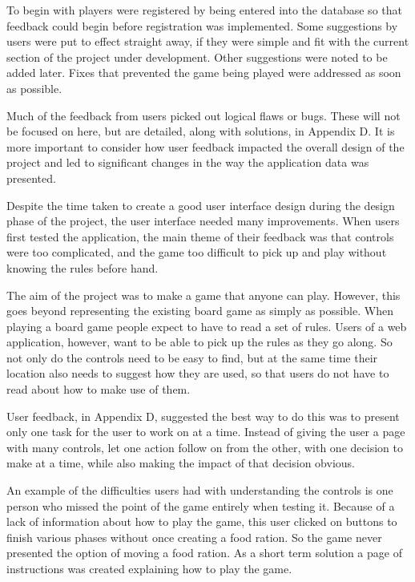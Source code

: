 To begin with players were registered by being entered into the database so that feedback could begin before registration was implemented. Some suggestions by users were put to effect straight away, if they were simple and fit with the current section of the project under development. Other suggestions were noted to be added later. Fixes that prevented the game being played were addressed as soon as possible.

Much of the feedback from users picked out logical flaws or bugs. These will not be focused on here, but are detailed, along with solutions, in Appendix D. It is more important to consider how user feedback impacted the overall design of the project and led to significant changes in the way the application data was presented.

Despite the time taken to create a good user interface design during the design phase of the project, the user interface needed many improvements. When users first tested the application, the main theme of their feedback was that controls were too complicated, and the game too difficult to pick up and play without knowing the rules before hand.

The aim of the project was to make a game that anyone can play. However, this goes beyond representing the existing board game as simply as possible. When playing a board game people expect to have to read a set of rules. Users of a web application, however, want to be able to pick up the rules as they go along. So not only do the controls need to be easy to find, but at the same time their location also needs to suggest how they are used, so that users do not have to read about how to make use of them.

User feedback, in Appendix D, suggested the best way to do this was to present only one task for the user to work on at a time. Instead of giving the user a page with many controls, let one action follow on from the other, with one decision to make at a time, while also making the impact of that decision obvious.

An example of the difficulties users had with understanding the controls is one person who missed the point of the game entirely when testing it. Because of a lack of information about how to play the game, this user clicked on buttons to finish various phases without once creating a food ration. So the game never presented the option of moving a food ration. As a short term solution a page of instructions was created explaining how to play the game.

